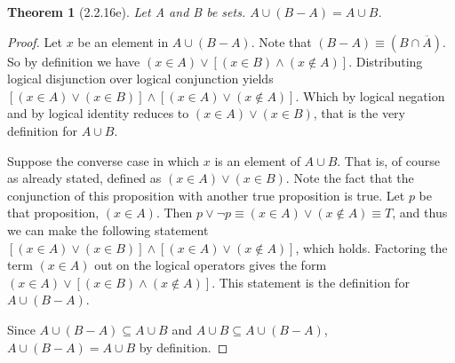 \documentclass[a4paper, 12pt]{article}
\theoremstyle{plain}
\newtheorem*{theorem*}{Theorem}
\begin{document}
	
	\begin{theorem*}[2.2.16e]
		Let A and B be sets. $A \cup (B - A) = A \cup B$.
	\end{theorem*}
	
	\begin{proof}
		Let $x$ be an element in $A \cup (B - A)$. Note that 
		$(B - A) \equiv (B \cap \overline{A})$. So by definition we have 
		$(x \in A) \lor [(x \in B) \land (x \notin A)]$. Distributing logical disjunction over 
		logical conjunction yields \newline 
		$[(x \in A) \lor (x \in B)] \land [(x \in A) \lor (x \notin A)]$. Which by logical negation 
		and by logical identity reduces to $(x \in A) \lor (x \in B)$, that is the very definition for 
		$A \cup B$.
		
		Suppose the converse case in which  $x$ is an element of $A \cup B$. That is, of course as 
		already stated, defined as $(x \in A) \lor (x \in B)$. Note the fact that the conjunction of 
		this proposition with another true proposition is true. Let $p$ be that proposition, 
		$(x \in A)$. Then $p \lor \lnot p \equiv (x \in A) \lor (x \notin A) \equiv T$, and thus we 
		can make the following statement 
		$[(x \in A) \lor (x \in B)] \land [(x \in A) \lor (x \notin A)]$, which holds. Factoring the 
		term $(x \in A)$ out on the logical operators gives the form 
		$(x \in A) \lor [(x \in B) \land (x \notin A)]$. This statement is the definition for 
		$A \cup (B - A)$.
		
		Since $A \cup (B - A) \subseteq A \cup B$ and 
		$A \cup B \subseteq A \cup (B - A)$, 
		\newline 
		$A \cup (B - A) = A \cup B$ by definition.
	\end{proof}
\end{document}
